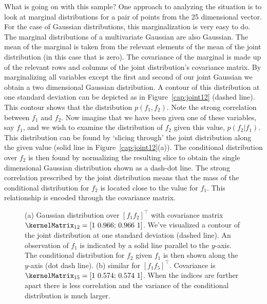 What is going on with this sample? One approach to analyzing the
situation is to look at marginal distributions for a pair of points
from the 25 dimensional vector. For the case of Gaussian
distributions, this marginalization is very easy to do. The marginal
distributions of a multivariate Gaussian are also Gaussian. The mean
of the marginal is taken from the relevant elements of the mean of the
joint distribution (in this case that is zero). The covariance of the
marginal is made up of the relevant rows and columns of the joint
distribution's covariance matrix. By marginalizing all variables
except the first and second of our joint Gaussian we obtain a two
dimensional Gaussian distribution. A contour of this distribution at
one standard deviation can be depicted as in Figure~\ref{cap:joint12}
(dashed line). This contour shows that the distribution
$p\left(f_{1},f_{2}\right)$. Note the strong correlation between
$f_{1}$ and $f_{2}$. Now imagine that we have been given one of these
variables, say $f_{1}$, and we wish to examine the distribution of
$f_{2}$ given this value, $p\left(f_{2}|f_{1}\right)$. This
distribution can be found by `slicing through' the joint distribution
along the given value (solid line in Figure~\ref{cap:joint12}(a)). The
conditional distribution over $f_{2}$ is then found by normalizing the
resulting slice to obtain the single dimensional Gaussian distribution
shown as a dash-dot line.  The strong correlation prescribed by the
joint distribution means that the mass of the conditional distribution
for $f_{2}$ is located close to the value for $f_{1}$. This
relationship is encoded through the covariance matrix.
%
\begin{figure}[htb]
\begin{centering}
  \hfill
\end{centering}
\caption{(a) Gaussian distribution over $\left[f_{1}
    f_{2}\right]^\top$ with covariance matrix
  $\kernelMatrix_{12}=\left[1~0.966\mathrm{;}~0.966~1\right]$. We've
  visualized a contour of the joint distribution at one standard
  deviation (dashed line). An observation of $f_{1}$ is indicated by a
  solid line parallel to the $y$-axis. The conditional distribution
  for $f_2$ given $f_1$ is then shown along the $y$-axis (dot dash
  line).\label{cap:joint12} (b) similar for $\left[f_{1}
    f_{5}\right]^\top$. Covariance is
  $\kernelMatrix_{15}=\left[1~0.574\mathrm{;}~0.574~1\right]$. When the
  indices are further apart there is less correlation and the variance
  of the conditional distribution is much larger.\label{cap:joint15}}

\end{figure}

